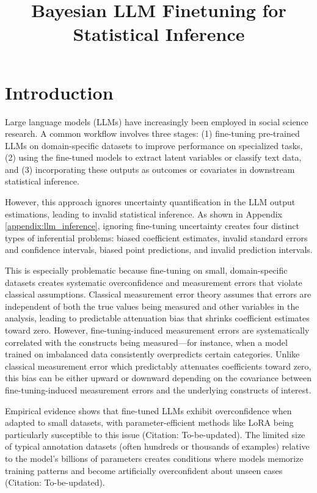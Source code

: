 \documentclass[11pt]{article}
\title{Bayesian LLM Finetuning for Statistical Inference}
\author{}
\date{}
\begin{document}
\maketitle
\vspace{-1in}

\section{Introduction}

Large language models (LLMs) have increasingly been employed in social science research.
A common workflow involves three stages:
(1) fine-tuning pre-trained LLMs on domain-specific datasets to improve performance on specialized tasks, 
(2) using the fine-tuned models to extract latent variables or classify text data, and 
(3) incorporating these outputs as outcomes or covariates in downstream statistical inference.

However, this approach ignores uncertainty quantification in the LLM output 
estimations, leading to invalid statistical inference. 
As shown in Appendix \ref{appendix:llm_inference}, 
ignoring fine-tuning uncertainty creates four distinct types of inferential problems: 
biased coefficient estimates, invalid standard errors and confidence intervals, 
biased point predictions, and invalid prediction intervals. 

This is especially problematic because fine-tuning on small, 
domain-specific datasets creates systematic overconfidence and measurement errors 
that violate classical assumptions. 
Classical measurement error theory assumes that errors are independent of both the true values being measured and other variables in the analysis, 
leading to predictable attenuation bias that shrinks coefficient estimates toward zero. 
However, fine-tuning-induced measurement errors are systematically correlated with the constructs being measured—for instance, 
when a model trained on imbalanced data consistently overpredicts certain categories. 
Unlike classical measurement error which predictably attenuates coefficients toward zero, 
this bias can be either upward or downward depending on the covariance between fine-tuning-induced measurement errors and the underlying constructs of interest.

Empirical evidence shows that fine-tuned LLMs exhibit overconfidence when adapted to small datasets, 
with parameter-efficient methods like LoRA being particularly susceptible to this issue (Citation: To-be-updated). 
The limited size of typical annotation datasets (often hundreds or thousands of examples) 
relative to the model's billions of parameters creates conditions where models memorize training patterns and
become artificially overconfident about unseen cases (Citation: To-be-updated).
\end{document}
